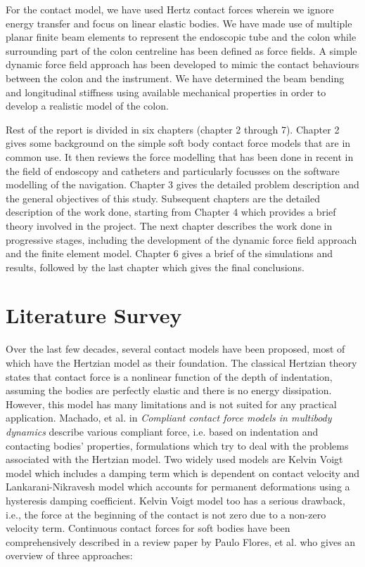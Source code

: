 \documentclass[12pt]{report}
\begin{document}
For the contact model, we have used Hertz contact forces wherein we ignore energy transfer and focus on linear elastic bodies. We have made use of multiple planar finite beam elements to represent the endoscopic tube and the colon while surrounding part of the colon centreline has been defined as force fields. A simple dynamic force field approach has been developed to mimic the contact behaviours between the colon and the instrument. We have determined the beam bending and longitudinal stiffness using available mechanical properties in order to develop a realistic model of the colon.\par

Rest of the report is divided in six chapters (chapter 2 through 7). Chapter 2 gives some background on the simple soft body contact force models that are in common use. It then reviews the force modelling that has been done in recent in the field of endoscopy and catheters and particularly focusses on the software modelling of the navigation. Chapter 3 gives the detailed problem description and the general objectives of this study. Subsequent chapters are the detailed description of the work done, starting from Chapter 4 which provides a brief theory involved in the project. The next chapter describes the work done in progressive stages, including the development of the dynamic force field approach and the finite element model. Chapter 6 gives a brief of the simulations and results, followed by the last chapter which gives the final conclusions.\par

\section*{Literature Survey}
Over the last few decades, several contact models have been proposed, most of which have the Hertzian model as their foundation. The classical Hertzian theory states that contact force is a nonlinear function of the depth of indentation, assuming the bodies are perfectly elastic and there is no energy dissipation. However, this model has many limitations and is not suited for any practical application. Machado, et al.\cite{MACHADO201299} in \textit{Compliant contact force models in multibody dynamics} describe various compliant force, i.e. based on indentation and contacting bodies' properties, formulations which try to deal with the problems associated with the Hertzian model. Two widely used models are Kelvin Voigt model which includes a damping term which is dependent on contact velocity and Lankarani-Nikravesh model which accounts for permanent deformations using a hysteresis damping coefficient. Kelvin Voigt model too has a serious drawback, i.e., the force at the beginning of the contact is not zero due to a non-zero velocity term. Continuous contact forces for soft bodies have been comprehensively described in a review paper by Paulo Flores\cite{Flores2011}, et al. who gives an overview of three approaches: \par
\end{document}
